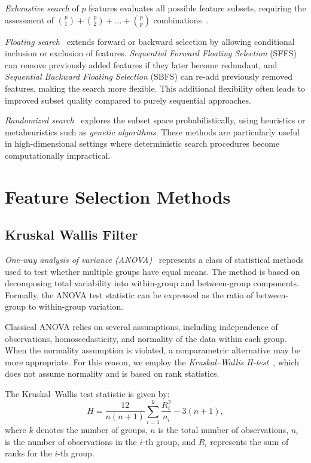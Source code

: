 \emph{Exhaustive search} of $p$ features evaluates all possible feature subsets, requiring the assessment of $\binom{p}{1} + \binom{p}{2} + \dots + \binom{p}{p}$ combinations~\cite{guyon2006}.

\emph{Floating search}~\cite{pudil1994} extends forward or backward selection by allowing conditional inclusion or exclusion of features. \emph{Sequential Forward Floating Selection} (SFFS) can remove previously added features if they later become redundant, and \emph{Sequential Backward Floating Selection} (SBFS) can re-add previously removed features, making the search more flexible. This additional flexibility often leads to improved subset quality compared to purely sequential approaches.

\emph{Randomized search}~\cite{holland1975} explores the subset space probabilistically, using heuristics or metaheuristics such as \emph{genetic algorithms}. These methods are particularly useful in high-dimensional settings where deterministic search procedures become computationally impractical.

\section{Feature Selection Methods}
\label{sec:feature-selection-methods}

\subsection{Kruskal Wallis Filter}

\emph{One-way analysis of variance (ANOVA)}~\cite{montgomery2013} represents a class of statistical methods used to test whether multiple groups have equal means. The method is based on decomposing total variability into within-group and between-group components. Formally, the ANOVA test statistic can be expressed as the ratio of between-group to within-group variation.

Classical ANOVA relies on several assumptions, including independence of observations, homoscedasticity, and normality of the data within each group. When the normality assumption is violated, a nonparametric alternative may be more appropriate. For this reason, we employ the \emph{Kruskal–Wallis H-test}~\cite{kruskal1952}, which does not assume normality and is based on rank statistics.

The Kruskal--Wallis test statistic is given by:
\[
H = \frac{12}{n(n+1)} \sum_{i=1}^{k} \frac{R_i^2}{n_i} - 3(n+1),
\]
where \(k\) denotes the number of groups, \(n\) is the total number of observations, \(n_i\) is the number of observations in the \(i\)-th group, and \(R_i\) represents the sum of ranks for the \(i\)-th group.

